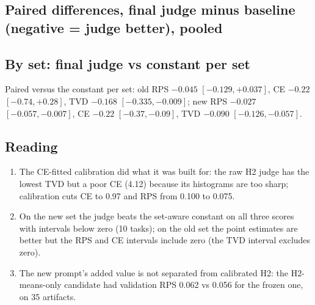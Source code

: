 \subsection*{Paired differences, final judge minus baseline (negative = judge better), pooled}
\begin{center}\small
{}
\end{center}

\subsection*{By set: final judge vs constant per set}
\begin{center}\small
{}
\end{center}
Paired versus the constant per set: old RPS $-0.045$ $[-0.129, +0.037]$, CE $-0.22$ $[-0.74, +0.28]$, TVD $-0.168$ $[-0.335, -0.009]$;
new RPS $-0.027$ $[-0.057, -0.007]$, CE $-0.22$ $[-0.37, -0.09]$, TVD $-0.090$ $[-0.126, -0.057]$.

\subsection*{Reading}
\begin{enumerate}
  \item The CE-fitted calibration did what it was built for: the raw H2 judge has the lowest TVD but a poor CE (4.12) because its histograms are too sharp; calibration cuts CE to 0.97 and RPS from 0.100 to 0.075.
  \item On the new set the judge beats the set-aware constant on all three scores with intervals below zero (10 tasks); on the old set the point estimates are better but the RPS and CE intervals include zero (the TVD interval excludes zero).
  \item The new prompt's added value is not separated from calibrated H2: the H2-means-only candidate had validation RPS 0.062 vs 0.056 for the frozen one, on 35 artifacts.
\end{enumerate}

